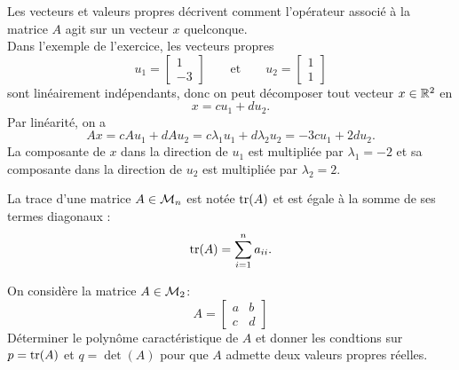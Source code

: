 \remark Les vecteurs et valeurs propres décrivent comment l'opérateur associé à la matrice $A$ agit sur un vecteur $x$ quelconque. \\
Dans l'exemple de l'exercice, les vecteurs propres 
$$
u_1 = \left[\begin{array}{r} 1 \\ -3 \end{array}\right]
\qquad \text{et} \qquad 
u_2 = \left[\begin{array}{r} 1 \\ 1 \end{array}\right]
$$
sont linéairement indépendants, donc on peut décomposer tout vecteur $x \in \mathbb{R}^2$ en
$$
x = c u_1 + d u_2.
$$
Par linéarité, on a 
$$
A x = c A u_1 + d A u_2 = c \lambda_1 u_1 + d \lambda_2 u_2 = -3 c u_1 + 2 d u_2.
$$
La composante de $x$ dans la direction de $u_1$ est multipliée par $\lambda_1 = -2$ et sa composante dans la direction de $u_2$ est multipliée par $\lambda_2 = 2$.


\begin{definition}[Trace]
  La trace d'une matrice $A \in \mathcal{M}_n$ est notée $\operatorname{tr}(A)$ et est égale à la somme de ses termes diagonaux :
  $$
  \operatorname{tr}(A) = \sum_{i=1}^n a_{ii}.
  $$
\end{definition}


\begin{exercise*}
  On considère la matrice $A \in \mathcal{M}_2$:
  $$
  A = \left[\begin{array}{cc} a & b \\ c & d\end{array}\right]
  $$
  Déterminer le polynôme caractéristique de $A$ et donner les condtions sur $p = \operatorname{tr}(A)$ et $q = \det(A)$ pour que $A$ admette deux valeurs propres réelles.
\end{exercise*}


